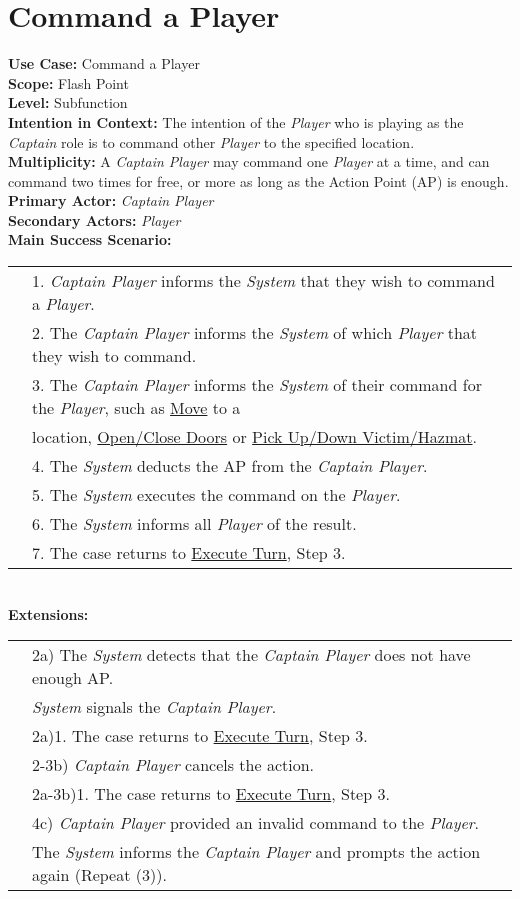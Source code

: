 \documentclass{article}
\begin{document}
	\section*{Command a Player}
	\textbf{Use Case:} Command a Player\\
	\textbf{Scope:} Flash Point\\
	\textbf{Level:} Subfunction\\
	\textbf{Intention in Context:} The intention of the \textit{Player} who is playing as the \textit{Captain} role is to command other \textit{Player} to the specified location.\\
	\textbf{Multiplicity: }A \textit{Captain Player} may command one \textit{Player} at a time, and can command two times for free, or more as long as the Action Point (AP) is enough.\\
	\textbf{Primary Actor:} \textit{Captain Player}\\
	\textbf{Secondary Actors:} \textit{Player}\\
	\textbf{Main Success Scenario:}\\
	\begin{tabular}{l l}
		&1. \textit{Captain Player} informs the \textit{System} that they wish to command a \textit{Player}.\\
		&2. The \textit{Captain Player} informs the \textit{System} of which \textit{Player} that they wish to command.\\
		&3. The \textit{Captain Player} informs the \textit{System} of their command for the \textit{Player}, such as \underline{Move} to a\\
		&\qquad location, \underline{Open/Close Doors} or \underline{Pick Up/Down Victim/Hazmat}.\\
		&4. The \textit{System} deducts the AP from the \textit{Captain Player}.\\
		&5. The \textit{System} executes the command on the \textit{Player}.\\
		&6. The \textit{System} informs all \textit{Player} of the result.\\
		&7. The case returns to \underline{Execute Turn}, Step 3.
	\end{tabular}\\
	\textbf{Extensions:}\\
	\begin{tabular}{l l}
		&2a) The \textit{System} detects that the \textit{Captain Player} does not have enough AP.\\ &\qquad\textit{System} signals the \textit{Captain Player}.\\
		&\qquad2a)1. The case returns to \underline{Execute Turn}, Step 3.\\
		&2-3b) \textit{Captain Player} cancels the action.\\
		&\qquad2a-3b)1. The case returns to \underline{Execute Turn}, Step 3.\\
		&4c) \textit{Captain Player} provided an invalid command to the \textit{Player}.\\
		&\qquad The \textit{System} informs the \textit{Captain Player} and prompts the action again (Repeat (3)).
	\end{tabular}\\
	
\end{document}
